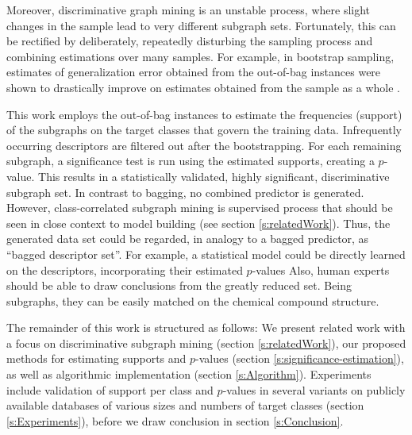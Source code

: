 \documentclass{article}
\begin{document}
Moreover, discriminative graph mining is an unstable process, where slight
changes in the sample lead to very different subgraph sets. Fortunately, this
can be rectified by deliberately, repeatedly disturbing the sampling process
and combining estimations over many samples. For example, in bootstrap
sampling, estimates of generalization error obtained from the out-of-bag
instances were shown to drastically improve on estimates obtained from the
sample as a whole \cite{bylander02estimating, breiman96oob}.

This work employs the out-of-bag instances to estimate the frequencies
(support) of the subgraphs on the target classes that govern the training data.
Infrequently occurring descriptors are filtered out after the bootstrapping.
For each remaining subgraph, a significance test is run using the estimated supports, creating a $p$-value. This results in a statistically
validated, highly significant, discriminative subgraph set.  In contrast to
bagging, no combined predictor is generated.  However, class-correlated
subgraph mining is supervised process that should be seen in close context to
model building (see section \ref{s:relatedWork}). Thus, the generated data set
could be regarded, in analogy to a bagged predictor, as ``bagged descriptor
set''. For example, a statistical model could be directly learned on the
descriptors, incorporating their estimated $p$-values Also, human experts
should be able to draw conclusions from the greatly reduced set. Being
subgraphs, they can be easily matched on the chemical compound structure.

The remainder of this work is structured as follows: We present related work
with a focus on discriminative subgraph mining (section \ref{s:relatedWork}),
our proposed methods for estimating supports and $p$-values (section
\ref{s:significance-estimation}), as well as algorithmic implementation
(section \ref{s:Algorithm}). Experiments include validation of support
per class and $p$-values in several variants on publicly available databases of
various sizes and numbers of target classes (section \ref{s:Experiments}),
before we draw conclusion in section \ref{s:Conclusion}.
\end{document}
